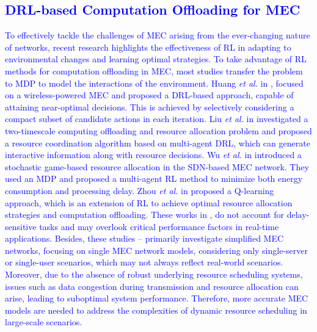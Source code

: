 \documentclass[12pt,draftclsnofoot,onecolumn]{IEEEtran}
\begin{document}
	
	\textcolor{blue}{\subsection{DRL-based Computation Offloading for MEC}
		To effectively tackle the challenges of MEC arising from the ever-changing nature of networks, recent research highlights the effectiveness of RL in adapting to environmental changes and learning optimal strategies. To take advantage of RL methods for computation offloading in MEC, most studies transfer the problem to MDP to model the interactions of the environment.
		Huang \textit{et al.} in \cite{huang2019deep}, focused on a wireless-powered MEC and proposed a DRL-based approach, capable of attaining near-optimal decisions. This is achieved by selectively considering a compact subset of candidate actions in each iteration. Liu \textit{et al.} in \cite{liu2021learn} investigated a two-timescale computing offloading and resource allocation problem and proposed a resource coordination algorithm based on multi-agent DRL, which can generate interactive information along with resource decisions. 
		Wu \textit{et al.} in \cite{wu2023computation} introduced a stochastic game-based resource allocation in the SDN-based MEC network. They used an MDP and proposed a multi-agent RL method to minimize both energy consumption and processing delay. 
		Zhou \textit{et al.} in \cite{zhou2021deep} proposed a Q-learning approach, which is an extension of RL to achieve optimal resource allocation strategies and computation offloading. 
		These works in \cite{huang2019deep}, \cite{liu2021learn} do not account for delay-sensitive tasks and may overlook critical performance factors in real-time applications. Besides, these studies \cite{huang2019deep}--\cite{zhou2021deep} primarily investigate simplified MEC networks, focusing on single MEC network models, considering only single-server or single-user scenarios, which may not always reflect real-world scenarios. 
		Moreover, due to the absence of robust underlying resource scheduling systems, issues such as data congestion during transmission and resource allocation can arise, leading to suboptimal system performance. Therefore, more accurate MEC models are needed to address the complexities of dynamic resource scheduling in large-scale scenarios.}
	
\end{document}
